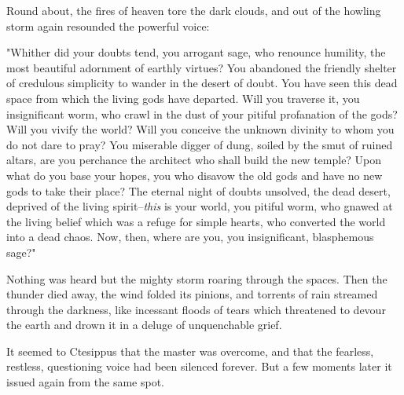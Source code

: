Round about, the fires of heaven tore the dark clouds, and out of the
howling storm again resounded the powerful voice:

"Whither did your doubts tend, you arrogant sage, who renounce
humility, the most beautiful adornment of earthly virtues? You
abandoned the friendly shelter of credulous simplicity to wander in
the desert of doubt. You have seen this dead space from which the
living gods have departed. Will you traverse it, you insignificant
worm, who crawl in the dust of your pitiful profanation of the gods?
Will you vivify the world? Will you conceive the unknown divinity to
whom you do not dare to pray? You miserable digger of dung, soiled by
the smut of ruined altars, are you perchance the architect who shall
build the new temple? Upon what do you base your hopes, you who
disavow the old gods and have no new gods to take their place? The
eternal night of doubts unsolved, the dead desert, deprived of the
living spirit--\emph{this} is your world, you pitiful worm, who gnawed at
the living belief which was a refuge for simple hearts, who converted
the world into a dead chaos. Now, then, where are you, you
insignificant, blasphemous sage?"

Nothing was heard but the mighty storm roaring through the spaces.
Then the thunder died away, the wind folded its pinions, and torrents
of rain streamed through the darkness, like incessant floods of tears
which threatened to devour the earth and drown it in a deluge of
unquenchable grief.

It seemed to Ctesippus that the master was overcome, and that the
fearless, restless, questioning voice had been silenced forever. But a
few moments later it issued again from the same spot.

